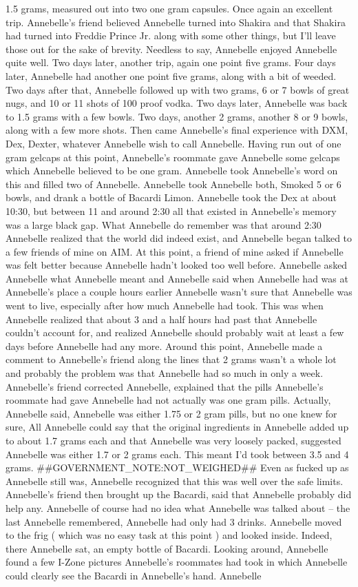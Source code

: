 \documentclass[12pt]{book}
\begin{document}
1.5 grams, measured out into two one gram capsules. Once again an excellent trip. Annebelle's friend believed Annebelle turned into Shakira and that Shakira had turned into Freddie Prince Jr. along with some other things, but I'll leave those out for the sake of brevity. Needless to say, Annebelle enjoyed Annebelle quite well. Two days later, another trip, again one point five grams. Four days later, Annebelle had another one point five grams, along with a bit of weeded. Two days after that, Annebelle followed up with two grams, 6 or 7 bowls of great nugs, and 10 or 11 shots of 100 proof vodka. Two days later, Annebelle was back to 1.5 grams with a few bowls. Two days, another 2 grams, another 8 or 9 bowls, along with a few more shots. Then came Annebelle's final experience with DXM, Dex, Dexter, whatever Annebelle wish to call Annebelle. Having run out of one gram gelcaps at this point, Annebelle's roommate gave Annebelle some gelcaps which Annebelle believed to be one gram. Annebelle took Annebelle's word on this and filled two of Annebelle. Annebelle took Annebelle both, Smoked 5 or 6 bowls, and drank a bottle of Bacardi Limon. Annebelle took the Dex at about 10:30, but between 11 and around 2:30 all that existed in Annebelle's memory was a large black gap. What Annebelle do remember was that around 2:30 Annebelle realized that the world did indeed exist, and Annebelle began talked to a few friends of mine on AIM. At this point, a friend of mine asked if Annebelle was felt better because Annebelle hadn't looked too well before. Annebelle asked Annebelle what Annebelle meant and Annebelle said when Annebelle had was at Annebelle's place a couple hours earlier Annebelle wasn't sure that Annebelle was went to live, especially after how much Annebelle had took. This was when Annebelle realized that about 3 and a half hours had past that Annebelle couldn't account for, and realized Annebelle should probably wait at least a few days before Annebelle had any more. Around this point, Annebelle made a comment to Annebelle's friend along the lines that 2 grams wasn't a whole lot and probably the problem was that Annebelle had so much in only a week. Annebelle's friend corrected Annebelle, explained that the pills Annebelle's roommate had gave Annebelle had not actually was one gram pills. Actually, Annebelle said, Annebelle was either 1.75 or 2 gram pills, but no one knew for sure, All Annebelle could say that the original ingredients in Annebelle added up to about 1.7 grams each and that Annebelle was very loosely packed, suggested Annebelle was either 1.7 or 2 grams each. This meant I'd took between 3.5 and 4 grams. \#\#GOVERNMENT\_NOTE:NOT\_WEIGHED\#\# Even as fucked up as Annebelle still was, Annebelle recognized that this was well over the safe limits. Annebelle's friend then brought up the Bacardi, said that Annebelle probably did help any. Annebelle of course had no idea what Annebelle was talked about -- the last Annebelle remembered, Annebelle had only had 3 drinks. Annebelle moved to the frig ( which was no easy task at this point ) and looked inside. Indeed, there Annebelle sat, an empty bottle of Bacardi. Looking around, Annebelle found a few I-Zone pictures Annebelle's roommates had took in which Annebelle could clearly see the Bacardi in Annebelle's hand. Annebelle 
\end{document}
